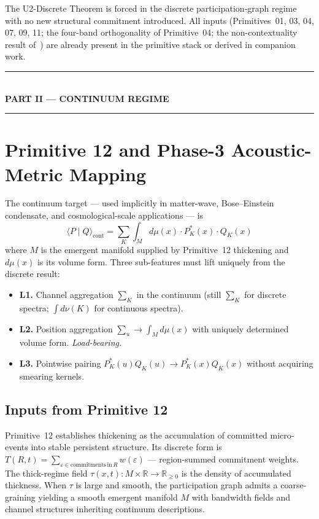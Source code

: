 \documentclass[11pt,a4paper]{article}
\begin{document}
The U2-Discrete Theorem is forced in the discrete participation-graph regime with no new structural commitment introduced. All inputs (Primitives~01, 03, 04, 07, 09, 11; the four-band orthogonality of Primitive~04; the non-contextuality result of~\cite{borngleason}) are already present in the primitive stack or derived in companion work.

\begin{center}
\rule{0.3\linewidth}{0.4pt}\\[0.5em]
{\large\bfseries PART II --- CONTINUUM REGIME}\\[0.2em]
\rule{0.3\linewidth}{0.4pt}
\end{center}

\section{Primitive 12 and Phase-3 Acoustic-Metric Mapping}\label{sec:p12phase3}

The continuum target --- used implicitly in matter-wave, Bose--Einstein condensate, and cosmological-scale applications --- is
\begin{equation}
\langle P \mid Q \rangle_\mathrm{cont} = \sum_K \int_M d\mu(x) \cdot P_K^*(x) \cdot Q_K(x)
\label{eq:innerproductcont}
\end{equation}
where $M$ is the emergent manifold supplied by Primitive~12 thickening and $d\mu(x)$ is its volume form. Three sub-features must lift uniquely from the discrete result:

\begin{itemize}
  \item \textbf{L1.} Channel aggregation $\sum_K$ in the continuum (still $\sum_K$ for discrete spectra; $\int d\nu(K)$ for continuous spectra).
  \item \textbf{L2.} Position aggregation $\sum_u \to \int_M d\mu(x)$ with uniquely determined volume form. \emph{Load-bearing.}
  \item \textbf{L3.} Pointwise pairing $P_K^*(u) Q_K(u) \to P_K^*(x) Q_K(x)$ without acquiring smearing kernels.
\end{itemize}

\subsection{Inputs from Primitive 12}

Primitive~12 establishes thickening as the accumulation of committed micro-events into stable persistent structure. Its discrete form is $T(R, t) = \sum_{\varepsilon \in \mathrm{commitments}\, \mathrm{in}\, R} w(\varepsilon)$ --- region-summed commitment weights. The thick-regime field $\tau(x, t) : M \times \mathbb{R} \to \mathbb{R}_{\geq 0}$ is the density of accumulated thickness. When $\tau$ is large and smooth, the participation graph admits a coarse-graining yielding a smooth emergent manifold $M$ with bandwidth fields and channel structures inheriting continuum descriptions.
\end{document}

